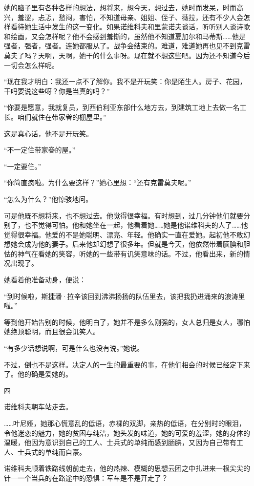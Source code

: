 她的脑子里有各种各样的想法，想将来，想今天，想过去，她时而发呆，时而高兴，羞涩，忐忑，愁闷，害怕，不知道母亲、姐姐、侄子、薇拉，还有不少人会怎样看待她生活中发生的这一变化。如果诺维科夫和里蒙诺夫谈话，听听别人谈诗歌和绘画，又会怎样呢？他不会感到羞惭的，虽然他不知道夏加尔和马蒂斯……他是强者，强者，强者。连她都服从了。战争会结束的。难道，难道她再也见不到克雷莫夫了吗？天啊，天啊，她干的什么事呀。现在就不想这些吧。因为还不知道今后一切会怎么样呢。

“现在我才明白：我还一点不了解你。我不是开玩笑：你是陌生人。房子、花园，干吗要说这些呀？你是当真的吗？”

“你要是愿意，我就复员，到西伯利亚东部什么地方去，到建筑工地上去做一名工长。咱们就住在带家眷的棚屋里。”

这是真心话，他不是开玩笑。

“不一定住带家眷的屋。”

“一定要住。”

“你简直疯啦。为什么要这样？”她心里想：“还有克雷莫夫呢。”

“怎么为什么？”他惊骇地问。

可是他既不想将来，也不想过去。他觉得很幸福。有时想到，过几分钟他们就要分别了，也不觉得可怕。他和她坐在一起，他看着她……她是他诺维科夫的人了……他觉得很幸福。他爱的不是她聪明、漂亮、年轻。他确实一直在爱她。起初他不敢幻想她会成为他的妻子。后来他却幻想了很多年。但就是今天，他依然带着腼腆和胆怯的神气在看她的笑容，听她的一些带有讥笑意味的话。不过，他看出来，新的情况出现了。

她看着他准备动身，便说：

“到时候啦，斯捷潘·拉辛该回到沸沸扬扬的队伍里去，该把我扔进涌来的浪涛里啦。”

等到他开始告别的时候，他明白了，她并不是多么刚强的，女人总归是女人，哪怕她绝顶聪明，而且很会讥笑人。

“有多少话想说啊，可是什么也没有说。”她说。

不过，倒也不是这样。决定人的一生的最重要的事，在他们相会的时候已经定下来了。他的确是爱她的。

四

诺维科夫朝车站走去。

……叶尼娅，她那心慌意乱的低语，赤裸的双脚，亲热的低语，在分别时的眼泪，令他迷恋的魅力，她的贫困与纯洁，她头发的味道，她的可爱的羞涩，她的身体的温暖，他因为意识到自己的工人、士兵式的单纯而感到腼腆，又因为自己带有工人、士兵式的单纯而自豪。

诺维科夫顺着铁路线朝前走去，他的热辣、模糊的思想云团之中扎进来一根尖尖的针—一个当兵的在路途中的恐惧：军车是不是开走了？

